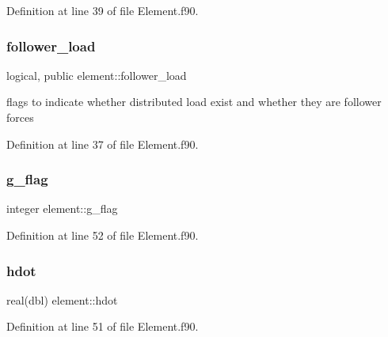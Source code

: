 Definition at line 39 of file Element.\+f90.

\mbox{\label{namespaceelement_a2babdd1ffcf39971fb9b118d88d1e223}} 
\subsubsection{\texorpdfstring{follower\+\_\+load}{follower\_load}}
{\footnotesize\ttfamily logical, public element\+::follower\+\_\+load}



flags to indicate whether distributed load exist and whether they are follower forces 



Definition at line 37 of file Element.\+f90.

\mbox{\label{namespaceelement_a4f9b46e901684a30dec91ad363247dd3}} 
\subsubsection{\texorpdfstring{g\+\_\+flag}{g\_flag}}
{\footnotesize\ttfamily integer element\+::g\+\_\+flag\hspace{0.3cm}{\ttfamily [private]}}



Definition at line 52 of file Element.\+f90.

\mbox{\label{namespaceelement_a50a818b525bc9fc33afce618163cb17e}} 
\subsubsection{\texorpdfstring{hdot}{hdot}}
{\footnotesize\ttfamily real(dbl) element\+::hdot\hspace{0.3cm}{\ttfamily [private]}}



Definition at line 51 of file Element.\+f90.

\mbox{\label{namespaceelement_a012a2b1125e535b957a6be4ea842da6d}} 
